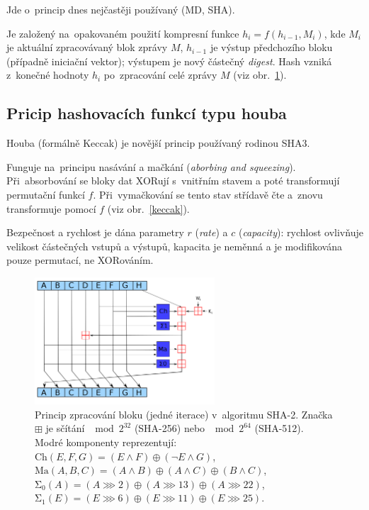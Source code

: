 Jde o~princip dnes nejčastěji používaný (MD, SHA).

Je založený na~opakovaném použití kompresní funkce $h_i = f(h_{i-1}, M_i)$, kde
$M_i$ je aktuální zpracovávaný blok zprávy $M$,
$h_{i-1}$ je výstup předchozího bloku (případně iniciační vektor);
výstupem je nový částečný \emph{digest}.
Hash vzniká z~konečné hodnoty $h_i$ po~zpracování celé zprávy $M$ (viz obr.~\ref{sha}).


\subsection{Pricip hashovacích funkcí typu houba}

Houba (formálně Keccak) je novější princip používaný rodinou SHA3.

Funguje na~principu nasávání a mačkání (\emph{aborbing and squeezing}).
Při~absorbování se bloky dat XORují s~vnitřním stavem a poté transformují permutační funkcí $f$.
Při~vymačkování se tento stav střídavě čte a~znovu transformuje pomocí $f$ (viz obr.~\ref{keccak}).

Bezpečnost a rychlost je dána parametry $r$ (\emph{rate}) a $c$ (\emph{capacity}): rychlost ovlivňuje velikost částečných vstupů a výstupů, kapacita je neměnná a je modifikována pouze permutací, ne XORováním.

\begin{figure}
    \centering
    \includegraphics[width=0.6\textwidth]{img/sha-construction}
    \caption{
        Princip zpracování bloku (jedné iterace) v~algoritmu SHA-2.
        Značka $\boxplus$ je sčítání $\mod 2^{32}$ (SHA-256) nebo $\mod 2^{64}$ (SHA-512).
        Modré komponenty reprezentují:
        \\
        $\mathrm{Ch}(E,F,G) = (E \wedge F) \oplus (\neg E \wedge G)$, \\
        $\mathrm{Ma}(A,B,C) = (A \wedge B) \oplus (A \wedge C) \oplus (B \wedge C)$, \\
        $\mathrm{\Sigma_0}(A) = (A \ggg 2) \oplus (A \ggg 13) \oplus (A \ggg 22)$, \\
        $\mathrm{\Sigma_1}(E) = (E \ggg 6) \oplus (E \ggg 11) \oplus (E \ggg 25)$.
        }
    \label{sha}
\end{figure}

